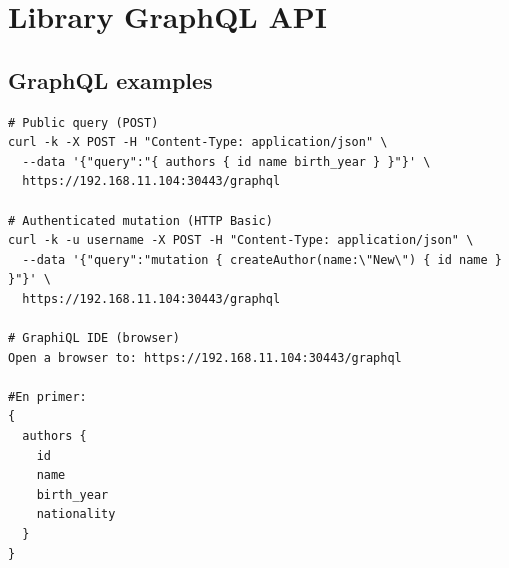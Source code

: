 \documentclass[11pt]{article}
\begin{document}
\section{Library GraphQL API}

\subsection*{GraphQL examples}
\begin{verbatim}
# Public query (POST)
curl -k -X POST -H "Content-Type: application/json" \
  --data '{"query":"{ authors { id name birth_year } }"}' \
  https://192.168.11.104:30443/graphql

# Authenticated mutation (HTTP Basic)
curl -k -u username -X POST -H "Content-Type: application/json" \
  --data '{"query":"mutation { createAuthor(name:\"New\") { id name } }"}' \
  https://192.168.11.104:30443/graphql

# GraphiQL IDE (browser)
Open a browser to: https://192.168.11.104:30443/graphql

#En primer:
{
  authors {
    id
    name
    birth_year
    nationality
  }
}
\end{verbatim}
\end{document}
